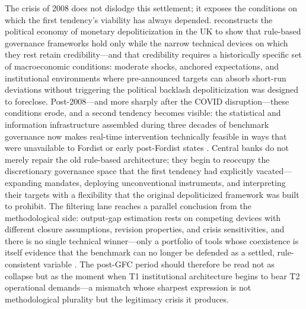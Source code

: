 \documentclass[11pt,a4paper]{article}
\begin{document}

The crisis of 2008 does not dislodge this settlement; it exposes the conditions on
which the first tendency's viability has always depended. \citet{Best2025}
reconstructs the political economy of monetary depoliticization in the UK to show
that rule-based governance frameworks hold only while the narrow technical devices
on which they rest retain credibility---and that credibility requires a
historically specific set of macroeconomic conditions: moderate shocks, anchored
expectations, and institutional environments where pre-announced targets can
absorb short-run deviations without triggering the political backlash
depoliticization was designed to foreclose. Post-2008---and more sharply after the
COVID disruption---these conditions erode, and a second tendency becomes visible:
the statistical and information infrastructure assembled during three decades of
benchmark governance now makes real-time intervention technically feasible in ways
that were unavailable to Fordist or early post-Fordist states
\citep{Foster2022}. Central banks do not merely repair the old rule-based
architecture; they begin to reoccupy the discretionary governance space that the
first tendency had explicitly vacated---expanding mandates, deploying
unconventional instruments, and interpreting their targets with a flexibility that
the original depoliticized framework was built to prohibit. The filtering lane
reaches a parallel conclusion from the methodological side: output-gap estimation
rests on competing devices with different closure assumptions, revision
properties, and crisis sensitivities, and there is no single technical
winner---only a portfolio of tools whose coexistence is itself evidence that the
benchmark can no longer be defended as a settled, rule-consistent variable
\citep{Hamilton2018,QuastWolters2022,DurandFornero2024}. The post-GFC period
should therefore be read not as collapse but as the moment when T1 institutional
architecture begins to bear T2 operational demands---a mismatch whose sharpest
expression is not methodological plurality but the legitimacy crisis it produces.


\end{document}
